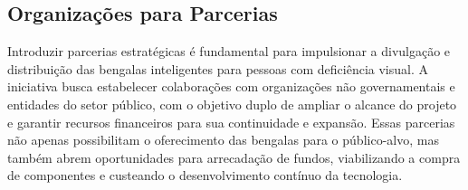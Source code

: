      
    \subsection{Organizações para Parcerias}
    Introduzir parcerias estratégicas é fundamental para impulsionar a divulgação e distribuição das bengalas inteligentes para pessoas com deficiência visual. A iniciativa busca estabelecer colaborações com organizações não governamentais e entidades do setor público, com o objetivo duplo de ampliar o alcance do projeto e garantir recursos financeiros para sua continuidade e expansão. Essas parcerias não apenas possibilitam o oferecimento das bengalas para o público-alvo, mas também abrem oportunidades para arrecadação de fundos, viabilizando a compra de componentes e custeando o desenvolvimento contínuo da tecnologia. 

